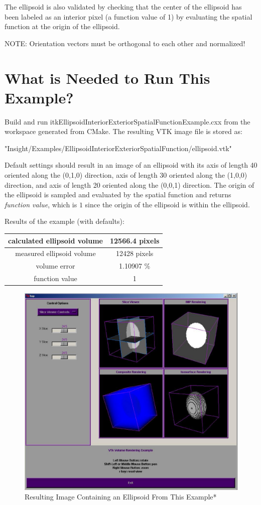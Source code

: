 \documentclass{InsightHowto}
\begin{document}
The ellipsoid is also validated by checking that the center of the ellipsoid has been
labeled as an interior pixel (a function value of 1) by evaluating the spatial function at
the origin of the ellipsoid.

NOTE: Orientation vectors must be orthogonal to each other and normalized!

\section{What is Needed to Run This Example?}

Build and run itkEllipsoidInteriorExteriorSpatialFunctionExample.cxx from the workspace
generated from CMake. The resulting VTK image file is stored as:

\begin{center}
"Insight/Examples/EllipsoidInteriorExteriorSpatialFunction/ellipsoid.vtk"
\end{center}

Default settings should result in an image of an ellipsoid with its axis of length 40
oriented along the (0,1,0) direction, axis of length 30 oriented along the (1,0,0)
direction, and axis of length 20 oriented along the (0,0,1) direction. The origin of the
ellipsoid is sampled and evaluated by the spatial function and returns \emph{function
value}, which is $1$ since the origin of the ellipsoid is within the ellipsoid.

   \begin{center}
   Results of the example (with defaults):\\
   \begin{tabular}{|c|c|}  %
   \hline            %
   calculated ellipsoid volume & 12566.4 pixels \\
   \hline
   measured ellipsoid volume & 12428 pixels \\
   \hline
   volume error & 1.10907 \% \\
   \hline
   function value  &  1 \\
   \hline
   \end{tabular}
   \end{center}

\begin{figure}[!hbp]
       \centering
       \includegraphics[width=.5\textwidth]{ellipsoid.eps}
       \caption{Resulting Image Containing an Ellipsoid From This Example* \label{Fig. 1.} }
\end{figure}
\end{document}
